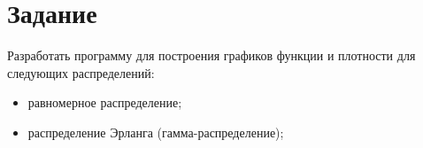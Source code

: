 \chapter*{Задание}

Разработать программу для построения графиков функции и плотности для следующих распределений:
\begin{itemize}
	\item равномерное распределение;
	\item распределение Эрланга (гамма-распределение);
\end{itemize}
